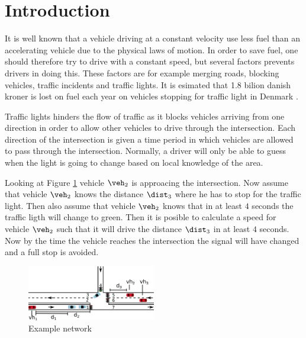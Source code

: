 \section{Introduction}

It is well known that a vehicle driving at a constant velocity use less fuel than an accelerating vehicle due to the physical laws of motion.\cite{Vejdir}
In order to save fuel, one should therefore try to drive with a constant speed, but several factors prevents drivers in doing this. 
These factors are for example merging roads, blocking vehicles, traffic incidents and traffic lights. 
It is esimated that 1.8 bilion danish kroner is lost on fuel each year on vehicles stopping for traffic light in Denmark \cite{Vejdir}.

Traffic lights hinders the flow of traffic as it blocks vehicles arriving from one direction in order to allow other vehicles to drive through the intersection.
Each direction of the intersection is given a time period in which vehicles are allowed to pass through the intersection. 
Normally, a driver will only be able to guess when the light is going to change based on local knowledge of the area. 

Looking at Figure \ref{fig:Introduction:network} vehicle $\veh_2$ is approacing the intersection.
Now assume that vehicle $\veh_2$ knows the distance $\dist_3$ where he has to stop for the traffic light. 
Then also assume that vehicle $\veh_2$ knows that in at least $4$ seconds the traffic ligth will change to green. 
Then it is posible to calculate a speed for vehicle $\veh_2$ such that it will drive the distance $\dist_3$ in at least $4$ seconds. 
Now by the time the vehicle reaches the intersection the signal will have changed and a full stop is avoided.
\begin{figure}[htb]
\centering
\includegraphics[width=0.5\textwidth]{images/introNetwork.png}
\caption{Example network}
\label{fig:Introduction:network}
\end{figure}

